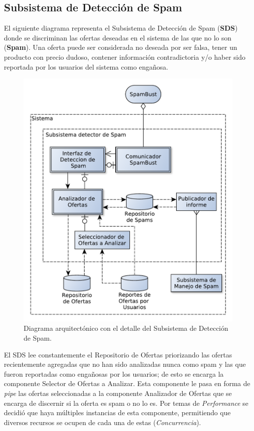 \subsection{Subsistema de Detección de Spam}

El siguiente diagrama representa el Subsistema de Detección de Spam (\textbf{SDS}) donde se discriminan las ofertas deseadas en el sistema de las que no lo son (\textbf{Spam}). Una oferta puede ser considerada no deseada por ser falsa, tener un producto con precio dudoso, contener información contradictoria y/o haber sido reportada por los usuarios del sistema como enga\~{n}osa.

\begin{figure}[H]
	\centering
	\includegraphics[width=\textwidth]{graficos/arch/Sistema_deteccion_spam.pdf}
	\caption{Diagrama arquitectónico con el detalle del \textsf{Subsistema de Detección de Spam}.}
\end{figure}

El SDS lee constantemente el \textsf{Repositorio de Ofertas} priorizando las ofertas recientemente agregadas que no han sido analizadas nunca como spam y las que fueron reportadas como enga\~{n}osas por los usuarios; de esto se encarga la componente \textsf{Selector de Ofertas a Analizar}. Esta componente le pasa en forma de \emph{pipe} las ofertas seleccionadas a la componente \textsf{Analizador de Ofertas} que se encarga de discernir si la oferta es spam o no lo es. Por temas de \emph{Performance} se decidió que haya múltiples instancias de esta componente, permitiendo que diversos recursos se ocupen de cada una de estas (\emph{Concurrencia}).
 \vspace{9pt} 


